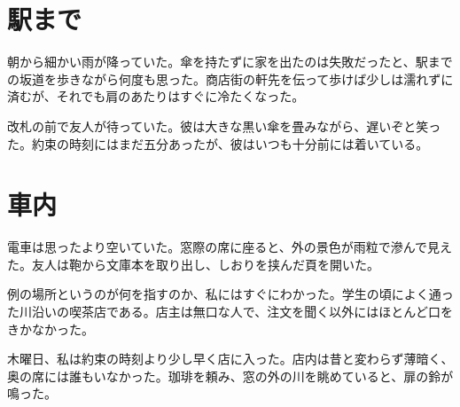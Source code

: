 \documentclass[tate,paper=a5,fontsize=10pt]{jlreq}
\begin{document}
\section{駅まで}
朝から細かい雨が降っていた。傘を持たずに家を出たのは失敗だったと、駅までの坂道を歩きながら何度も思った。商店街の軒先を伝って歩けば少しは濡れずに済むが、それでも肩のあたりはすぐに冷たくなった。

改札の前で友人が待っていた。彼は大きな黒い傘を畳みながら、遅いぞと笑った。約束の時刻にはまだ五分あったが、彼はいつも十分前には着いている。

\section{車内}
電車は思ったより空いていた。窓際の席に座ると、外の景色が雨粒で滲んで見えた。友人は鞄から文庫本を取り出し、しおりを挟んだ頁を開いた。

例の場所というのが何を指すのか、私にはすぐにわかった。学生の頃によく通った川沿いの喫茶店である。店主は無口な人で、注文を聞く以外にはほとんど口をきかなかった。

木曜日、私は約束の時刻より少し早く店に入った。店内は昔と変わらず薄暗く、奥の席には誰もいなかった。珈琲を頼み、窓の外の川を眺めていると、扉の鈴が鳴った。
\end{document}
